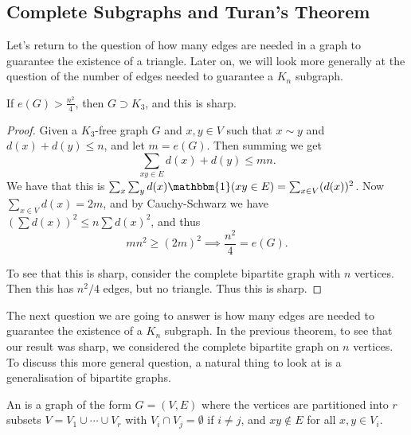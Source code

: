 \subsection{Complete Subgraphs and Turan's Theorem}

Let's return to the question of how many edges are needed in a graph to guarantee the existence of a triangle. Later on, we will look more generally at the question of the number of edges needed to guarantee a $K_n$ subgraph.

\begin{theorem}
	If $e(G) > \frac{n^2}{4}$, then $G \supset K_3$, and this is sharp.
\end{theorem}
\begin{proof}
	Given a $K_3$-free graph $G$ and $x, y \in V$ such that $x \sim y$ and $d(x) + d(y) \leq n$, and let $m = e(G)$.
	Then summing we get
	$$
	\sum_{xy \in E} d(x) + d(y) \leq mn.
	$$
	We have that this is $\sum_x \sum_y d(x) \mathbbm{1}(xy \in E) = \sum_{x \in V} (d(x))^2$.
	Now $\sum_{x \in V} d(x) = 2m$, and by Cauchy-Schwarz we have $(\sum d(x))^2 \leq n\sum d(x)^2$, and thus
	$$
	m n^2 \geq (2m)^2 \implies \frac{n^2}{4} = e(G).
	$$

	To see that this is sharp, consider the complete bipartite graph with $n$ vertices. Then this has $n^2/4$ edges, but no triangle. Thus this is sharp.
\end{proof}

The next question we are going to answer is how many edges are needed to guarantee the existence of a $K_n$ subgraph. In the previous theorem, to see that our result was sharp, we considered the complete bipartite graph on $n$ vertices. To discuss this more general question, a natural thing to look at is a generalisation of bipartite graphs.

\begin{definition}
    An  is a graph of the form $G = (V, E)$ where the vertices are partitioned into $r$ subsets $V = V_1 \cup \cdots \cup V_r$ with $V_i \cap V_j = \emptyset$ if $i \neq j$, and $xy \not\in E$ for all $x, y \in V_i$.
\end{definition}

